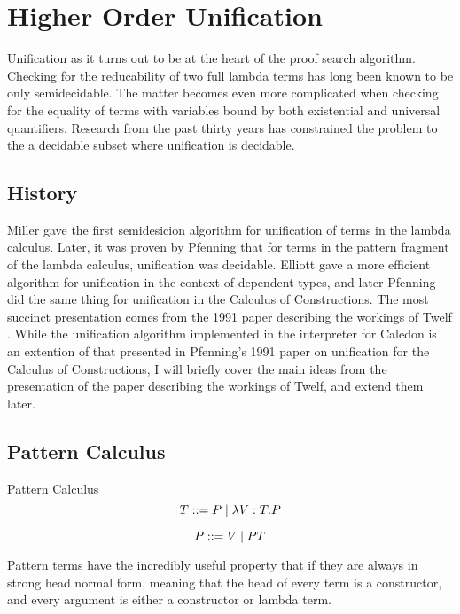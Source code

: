 \section{Higher Order Unification}

Unification as it turns out to be at the heart of the proof search algorithm.  Checking for the 
reducability of two full lambda terms has long been known to be only semidecidable.  
The matter becomes even more complicated when checking for the equality of terms with variables bound
by both existential and universal quantifiers.  Research from the past thirty years has constrained
the problem to the a decidable subset where unification is decidable. 


\subsection{History}

Miller \citep{miller1986higher} gave the first semidesicion algorithm for unification of 
terms in the lambda calculus.  
Later, it was proven by Pfenning \citep{pfenning1988partial} \citep{pfenning1988higher} 
that for terms in the pattern fragment of the lambda calculus, unification was decidable.  
Elliott\citep{elliott1989higher} gave a more efficient algorithm for unification in the context 
of dependent types, and later Pfenning \citep{pfenning1991unification}
did the same thing for unification in the Calculus of Constructions.  
The most succinct presentation comes from the 1991 paper describing the workings of Twelf 
\citep{pfenning1991logic}.  While the unification algorithm implemented in the interpreter for Caledon is 
an extention of that presented in Pfenning's 1991 paper on unification for 
the Calculus of Constructions\citep{pfenning1991unification}, 
I will briefly cover the main ideas from the presentation of the paper describing the workings of Twelf, 
and extend them later.

\subsection{Pattern Calculus}

\begin{definition}
Pattern Calculus
\[
T ::= P
   \; | \; \lambda V : T . P 
\]

\[
P ::= V 
  \; | \; P T 
\]
\end{definition}

Pattern terms have the incredibly useful property that if they are always in strong head normal form, meaning
that the head of every term is a constructor, and every argument is either a constructor or lambda term.

